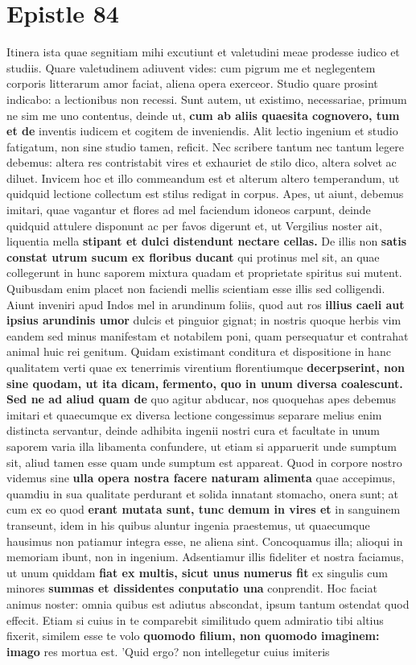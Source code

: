 \section{Epistle 84}
Itinera ista quae segnitiam mihi excutiunt et valetudini meae prodesse iudico et studiis. Quare valetudinem adiuvent vides: cum pigrum me et neglegentem corporis litterarum amor faciat, aliena opera exerceor. Studio quare prosint indicabo: a lectionibus non recessi. Sunt autem, ut existimo, necessariae, primum ne sim me uno contentus, deinde ut, \textbf{cum \textbf{ab aliis quaesita cognovero, tum et de}} inventis iudicem et cogitem de inveniendis. Alit lectio ingenium et studio fatigatum, non sine studio tamen, reficit. Nec scribere tantum nec tantum legere debemus: altera res contristabit vires et exhauriet de stilo dico, altera solvet ac diluet. Invicem hoc et illo commeandum est et alterum altero temperandum, ut quidquid lectione collectum est stilus redigat in corpus. Apes, ut aiunt, debemus imitari, quae vagantur et flores ad mel faciendum idoneos carpunt, deinde quidquid attulere disponunt ac per favos digerunt et, ut Vergilius noster ait, liquentia mella \textbf{stipant et dulci distendunt nectare cellas.} De illis non \textbf{satis constat utrum sucum ex floribus ducant} qui protinus mel sit, an quae collegerunt in hunc saporem mixtura quadam et proprietate spiritus sui mutent. Quibusdam enim placet non faciendi mellis scientiam esse illis sed colligendi. Aiunt inveniri apud Indos mel in arundinum foliis, quod aut ros \textbf{illius caeli aut ipsius arundinis umor} dulcis et pinguior gignat; in nostris quoque herbis vim eandem sed minus manifestam et notabilem poni, quam persequatur et contrahat animal huic rei genitum. Quidam existimant conditura et dispositione in hanc qualitatem verti quae ex tenerrimis virentium florentiumque \textbf{decerpserint, non sine quodam, ut ita dicam,} \textbf{fermento, quo in \textbf{unum \textbf{\textbf{diversa coalescunt.} Sed ne ad aliud} quam} de} quo agitur abducar, nos quoquehas apes debemus imitari et quaecumque ex diversa lectione congessimus separare melius enim distincta servantur, deinde adhibita ingenii nostri cura et facultate in unum saporem varia illa libamenta confundere, ut etiam si apparuerit unde sumptum sit, aliud tamen esse quam unde sumptum est appareat. Quod in corpore nostro videmus sine \textbf{ulla opera nostra facere naturam alimenta} quae accepimus, quamdiu in sua qualitate perdurant et solida innatant stomacho, onera sunt; at cum ex eo quod \textbf{erant mutata sunt, tunc demum in vires et} in sanguinem transeunt, idem in his quibus aluntur ingenia praestemus, ut quaecumque hausimus non patiamur integra esse, ne aliena sint. Concoquamus illa; alioqui in memoriam ibunt, non in ingenium. Adsentiamur illis fideliter et nostra faciamus, ut unum quiddam \textbf{fiat ex multis, sicut unus numerus fit} ex singulis cum minores \textbf{summas et dissidentes conputatio una} conprendit. Hoc faciat animus noster: omnia quibus est adiutus abscondat, ipsum tantum ostendat quod effecit. Etiam si cuius in te comparebit similitudo quem admiratio tibi altius fixerit, similem esse te volo \textbf{quomodo filium, non quomodo imaginem: imago} res mortua est. 'Quid ergo? non intellegetur cuius imiteris 